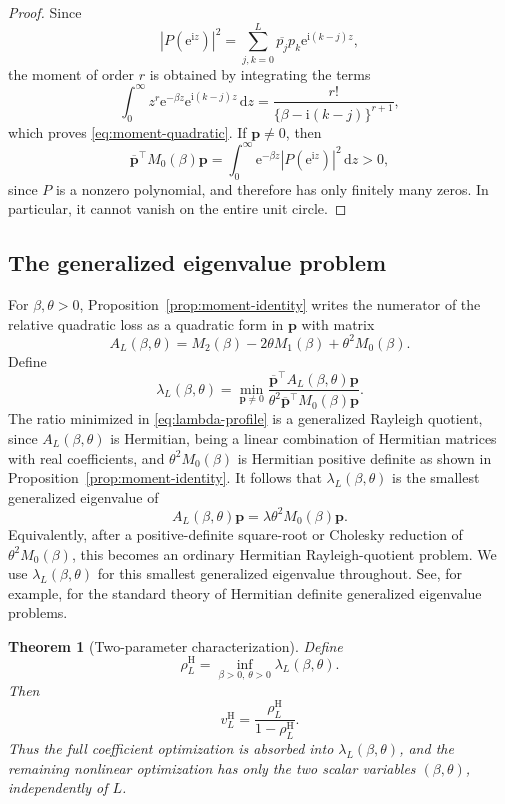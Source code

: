 \documentclass[11pt]{article}
\numberwithin{equation}{section}
\newtheorem{theorem}{Theorem}[section]
\theoremstyle{remark}
\newcommand{\e}{\mathrm e}
\newcommand{\ii}{\mathrm i}
\newcommand{\dd}{\,\mathrm d}
\newcommand{\abs}[1]{\left|#1\right|}
\newcommand{\vH}{v^{\mathrm H}}
\newcommand{\rhoH}{\rho^{\mathrm H}}
\begin{document}
\begin{proof}
Since
\[
  \abs{P(\e^{\ii z})}^2
  =\sum_{j,k=0}^{L}\overline{p_j}p_k\e^{\ii(k-j)z},
\]
the moment of order $r$ is obtained by integrating the terms
\[
  \int_0^\infty z^r\e^{-\beta z}\e^{\ii(k-j)z}\dd z
  =\frac{r!}{\{\beta-\ii(k-j)\}^{r+1}},
\]
which proves \eqref{eq:moment-quadratic}. If $\bm p\neq0$, then
\[
  \overline{\bm p}^{\top}M_0(\beta)\bm p
  =\int_0^\infty\e^{-\beta z}\abs{P(\e^{\ii z})}^2\dd z>0,
\]
since $P$ is a nonzero polynomial, and therefore has only finitely many zeros. In particular, it cannot vanish on the entire unit circle.

\end{proof}

\subsection{The generalized eigenvalue problem}

For $\beta,\theta>0$, Proposition~\ref{prop:moment-identity} writes the numerator of the relative quadratic loss as a quadratic form in $\bm p$ with matrix
\[
  A_L(\beta,\theta)
  =M_2(\beta)-2\theta M_1(\beta)+\theta^2M_0(\beta).
\]
Define
\begin{equation}\label{eq:lambda-profile}
  \lambda_L(\beta,\theta)
  =\min_{\bm p\neq0}
    \frac{\overline{\bm p}^{\top}A_L(\beta,\theta)\bm p}
         {\theta^2\overline{\bm p}^{\top}M_0(\beta)\bm p}.
\end{equation}
The ratio minimized in \eqref{eq:lambda-profile} is a generalized Rayleigh quotient, since $A_L(\beta,\theta)$ is Hermitian, being a linear combination of Hermitian matrices with real coefficients, and $\theta^2 M_0(\beta)$ is Hermitian positive definite as shown in Proposition~\ref{prop:moment-identity}. It follows that $\lambda_L(\beta,\theta)$ is the smallest generalized eigenvalue of
\[
  A_L(\beta,\theta)\bm p
  =\lambda\theta^2M_0(\beta)\bm p.
\]
Equivalently, after a positive-definite square-root or Cholesky reduction of $\theta^2M_0(\beta)$, this becomes an ordinary Hermitian Rayleigh-quotient problem. We use $\lambda_L(\beta,\theta)$ for this smallest generalized eigenvalue throughout. See, for example, \citet{GolubVanLoan2013} for the standard theory of Hermitian definite generalized eigenvalue problems.

\begin{theorem}[Two-parameter characterization]\label{thm:two-parameter}
Define
\[
  \rhoH_L
  =\inf_{\beta>0,\,\theta>0}\lambda_L(\beta,\theta).
\]
Then
\begin{equation}\label{eq:v-from-rho}
  \vH_L=\frac{\rhoH_L}{1-\rhoH_L}.
\end{equation}
Thus the full coefficient optimization is absorbed into $\lambda_L(\beta,\theta)$, and the remaining nonlinear optimization has only the two scalar variables $(\beta,\theta)$, independently of $L$.
\end{theorem}
\end{document}
